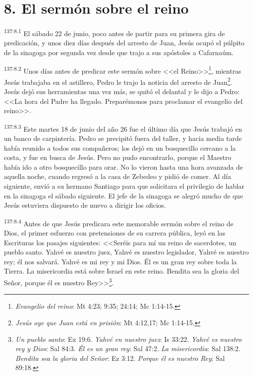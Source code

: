 \section*{8. El sermón sobre el reino}
\par 
\textsuperscript{137:8.1} El sábado 22 de junio, poco antes de partir para su primera gira de predicación, y unos diez días después del arresto de Juan, Jesús ocupó el púlpito de la sinagoga por segunda vez desde que trajo a sus apóstoles a Cafarnaúm.

\par 
\textsuperscript{137:8.2} Unos días antes de predicar este sermón sobre <<el Reino>>\footnote{\textit{Evangelio del reino}: Mt 4:23; 9:35; 24:14; Mc 1:14-15.}, mientras Jesús trabajaba en el astillero, Pedro le trajo la noticia del arresto de Juan\footnote{\textit{Jesús oye que Juan está en prisión}: Mt 4:12,17; Mc 1:14-15.}. Jesús dejó sus herramientas una vez más, se quitó el delantal y le dijo a Pedro: <<La hora del Padre ha llegado. Preparémonos para proclamar el evangelio del reino>>.

\par 
\textsuperscript{137:8.3} Este martes 18 de junio del año 26 fue el último día que Jesús trabajó en un banco de carpintería. Pedro se precipitó fuera del taller, y hacia media tarde había reunido a todos sus compañeros; los dejó en un bosquecillo cercano a la costa, y fue en busca de Jesús. Pero no pudo encontrarlo, porque el Maestro había ido a otro bosquecillo para orar. No lo vieron hasta una hora avanzada de aquella noche, cuando regresó a la casa de Zebedeo y pidió de comer. Al día siguiente, envió a su hermano Santiago para que solicitara el privilegio de hablar en la sinagoga el sábado siguiente. El jefe de la sinagoga se alegró mucho de que Jesús estuviera dispuesto de nuevo a dirigir los oficios.

\par 
\textsuperscript{137:8.4} Antes de que Jesús predicara este memorable sermón sobre el reino de Dios, el primer esfuerzo con pretensiones de su carrera pública, leyó en las Escrituras los pasajes siguientes: <<Seréis para mí un reino de sacerdotes, un pueblo santo. Yahvé es nuestro juez, Yahvé es nuestro legislador, Yahvé es nuestro rey; él nos salvará. Yahvé es mi rey y mi Dios. Él es un gran rey sobre toda la Tierra. La misericordia está sobre Israel en este reino. Bendita sea la gloria del Señor, porque él es nuestro Rey>>\footnote{\textit{Un pueblo santo}: Ex 19:6. \textit{Yahvé en nuestro juez}: Is 33:22. \textit{Yahvé es nuestro rey y Dios}: Sal 84:3. \textit{Él es un gran rey}: Sal 47:2. \textit{La misericordia}: Sal 138:2. \textit{Bendita sea la gloria del Señor}: Ez 3:12. \textit{Porque él es nuestro Rey}: Sal 89:18.}.

